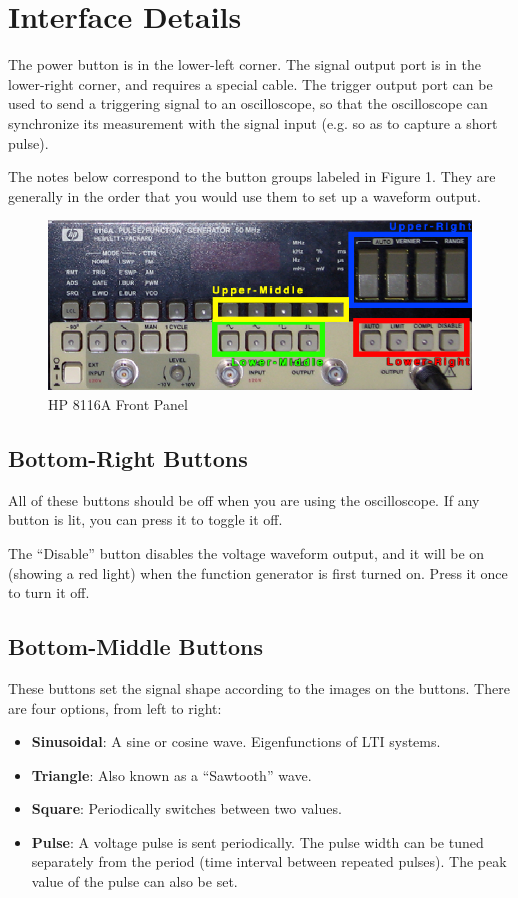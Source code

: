 \documentclass{article}
\begin{document}
\section{Interface Details}
The power button is in the lower-left corner. The signal output port is in the lower-right corner, and requires a special cable. The trigger output port can be used to send a triggering signal to an oscilloscope, so that the oscilloscope can synchronize its measurement with the signal input (e.g. so as to capture a short pulse).

The notes below correspond to the button groups labeled in Figure 1. They are generally in the order that you would use them to set up a waveform output.

\begin{figure}[!htb]
  \centering
  \includegraphics[width=5.0in]{HP8116A.eps}
  \caption{HP 8116A Front Panel}
  \label{HP8116A}
\end{figure}

\subsection{Bottom-Right Buttons}
All of these buttons should be off when you are using the oscilloscope. If any button is lit, you can press it to toggle it off.

The ``Disable'' button disables the voltage waveform output, and it will be on (showing a red light) when the function generator is first turned on. Press it once to turn it off.

\subsection{Bottom-Middle Buttons}
These buttons set the signal shape according to the images on the buttons. There are four options, from left to right:
\begin{itemize}
\item \textbf{Sinusoidal}: A sine or cosine wave. Eigenfunctions of LTI systems.
\item \textbf{Triangle}: Also known as a ``Sawtooth'' wave. 
\item \textbf{Square}: Periodically switches between two values.
\item \textbf{Pulse}: A voltage pulse is sent periodically. The pulse width can be tuned separately from the period (time interval between repeated pulses). The peak value of the pulse can also be set.
\end{itemize}
\end{document}
